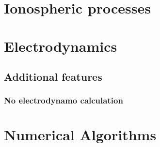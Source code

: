 \documentclass[12pt]{book}
\begin{document}
\chapter{Ionospheric processes}

\chapter{Electrodynamics}









\section{Additional features}

\subsection{No electrodynamo calculation}

\chapter{Numerical Algorithms}

%


\printindex
%
\end{document}
